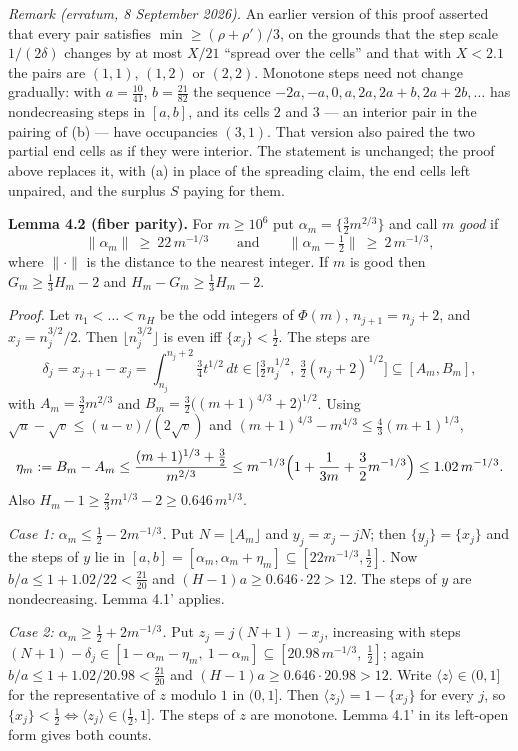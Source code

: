 \documentclass[11pt,a4paper]{article}
\begin{document}
\emph{Remark (erratum, 8 September 2026).} An earlier version of this
proof asserted that every pair satisfies \(\min\ge(\rho+\rho')/3\), on
the grounds that the step scale \(1/(2\delta)\) changes by at most
\(X/21\) ``spread over the cells'' and that with \(X<2.1\) the pairs are
\((1,1)\), \((1,2)\) or \((2,2)\). Monotone steps need not change
gradually: with \(a=\tfrac{10}{41}\), \(b=\tfrac{21}{82}\) the sequence
\(-2a,-a,0,a,2a,2a+b,2a+2b,\dots\) has nondecreasing steps in \([a,b]\),
and its cells \(2\) and \(3\) --- an interior pair in the pairing of (b)
--- have occupancies \((3,1)\). That version also paired the two partial
end cells as if they were interior. The statement is unchanged; the
proof above replaces it, with (a) in place of the spreading claim, the
end cells left unpaired, and the surplus \(S\) paying for them.

\textbf{Lemma 4.2 (fiber parity).} For \(m\ge 10^6\) put
\(\alpha_m=\{\tfrac32m^{2/3}\}\) and call \(m\) \emph{good} if \[
\|\alpha_m\|\ \ge\ 22\,m^{-1/3}
\qquad\text{and}\qquad
\|\alpha_m-\tfrac12\|\ \ge\ 2\,m^{-1/3},
\] where \(\|\cdot\|\) is the distance to the nearest integer. If \(m\)
is good then \(G_m\ge\tfrac13H_m-2\) and \(H_m-G_m\ge\tfrac13H_m-2\).

\emph{Proof.} Let \(n_1<\dots<n_H\) be the odd integers of \(\Phi(m)\),
\(n_{j+1}=n_j+2\), and \(x_j=n_j^{3/2}/2\). Then
\(\lfloor n_j^{3/2}\rfloor\) is even iff \(\{x_j\}<\tfrac12\). The steps
are \[
\delta_j=x_{j+1}-x_j=\int_{n_j}^{n_j+2}\tfrac34t^{1/2}\,dt
\in\bigl[\tfrac32n_j^{1/2},\ \tfrac32(n_j+2)^{1/2}\bigr]
\subseteq[A_m,B_m],
\] with \(A_m=\tfrac32m^{2/3}\) and
\(B_m=\tfrac32\bigl((m+1)^{4/3}+2\bigr)^{1/2}\). Using
\(\sqrt u-\sqrt v\le(u-v)/(2\sqrt v)\) and
\((m+1)^{4/3}-m^{4/3}\le\tfrac43(m+1)^{1/3}\), \[
\eta_m:=B_m-A_m\le\frac{(m+1)^{1/3}+\tfrac32}{m^{2/3}}
\le m^{-1/3}\Bigl(1+\frac1{3m}+\frac32m^{-1/3}\Bigr)\le 1.02\,m^{-1/3}.
\] Also \(H_m-1\ge\tfrac23m^{1/3}-2\ge 0.646\,m^{1/3}\).

\emph{Case 1: \(\alpha_m\le\tfrac12-2m^{-1/3}\).} Put
\(N=\lfloor A_m\rfloor\) and \(y_j=x_j-jN\); then \(\{y_j\}=\{x_j\}\)
and the steps of \(y\) lie in
\([a,b]=[\alpha_m,\alpha_m+\eta_m]\subseteq[22m^{-1/3},\tfrac12]\). Now
\(b/a\le 1+1.02/22<\tfrac{21}{20}\) and \((H-1)a\ge 0.646\cdot 22>12\).
The steps of \(y\) are nondecreasing. Lemma 4.1' applies.

\emph{Case 2: \(\alpha_m\ge\tfrac12+2m^{-1/3}\).} Put
\(z_j=j(N+1)-x_j\), increasing with steps
\((N+1)-\delta_j\in[1-\alpha_m-\eta_m,\ 1-\alpha_m]\subseteq[20.98\,m^{-1/3},\ \tfrac12]\);
again \(b/a\le 1+1.02/20.98<\tfrac{21}{20}\) and
\((H-1)a\ge 0.646\cdot 20.98>12\). Write \(\langle z\rangle\in(0,1]\)
for the representative of \(z\) modulo \(1\) in \((0,1]\). Then
\(\langle z_j\rangle=1-\{x_j\}\) for every \(j\), so
\(\{x_j\}<\tfrac12\iff\langle z_j\rangle\in(\tfrac12,1]\). The steps of
\(z\) are monotone. Lemma 4.1' in its left-open form gives both counts.
\end{document}
